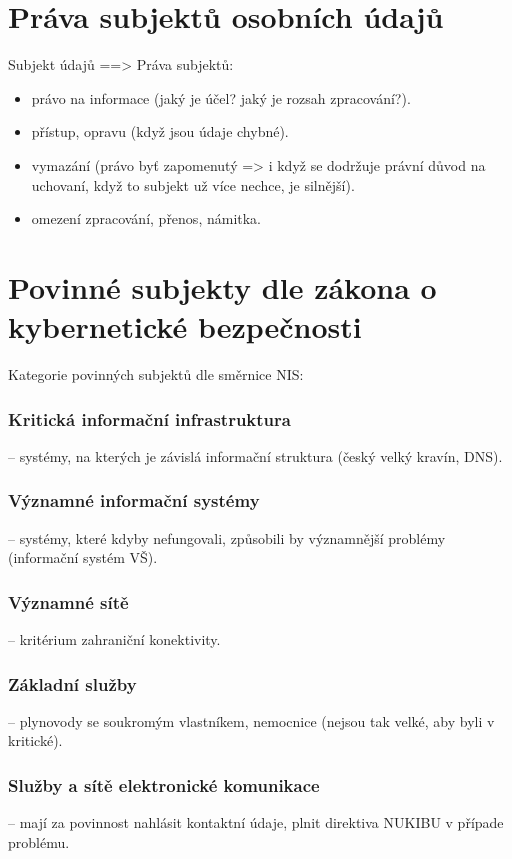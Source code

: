 \section{Práva subjektů osobních údajů}
Subjekt údajů ==> 
Práva subjektů:
\begin{itemize}
        \item právo na informace (jaký je účel? jaký je rozsah zpracování?).
        \item přístup, opravu (když jsou údaje chybné).
        \item vymazání (právo byť zapomenutý => i když se dodržuje právní důvod na uchovaní, když to subjekt už více nechce,  je silnější).
        \item omezení zpracování, přenos, námitka.
\end{itemize}

\clearpage
\section{Povinné subjekty dle zákona o kybernetické bezpečnosti}
Kategorie povinných subjektů dle směrnice NIS:

\subsubsection*{Kritická informační infrastruktura} -- systémy, na kterých je závislá informační struktura (český velký kravín, DNS).
\subsubsection*{Významné informační systémy} -- systémy, které kdyby nefungovali, způsobili by významnější problémy (informační systém VŠ).
\subsubsection*{Významné sítě} -- kritérium zahraniční konektivity.
\subsubsection*{Základní služby} -- plynovody se soukromým vlastníkem, nemocnice (nejsou tak velké, aby byli v kritické).
\subsubsection*{Služby a sítě elektronické komunikace} -- mají za povinnost nahlásit kontaktní údaje, plnit direktiva NUKIBU v případe problému.
